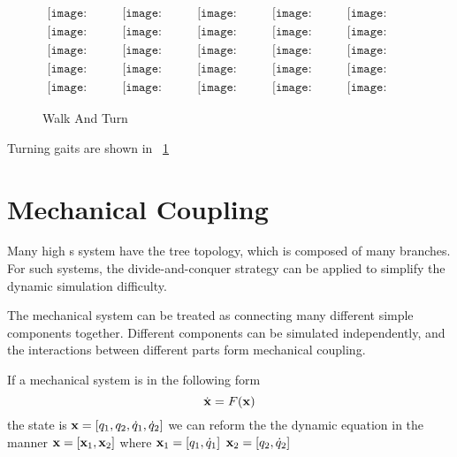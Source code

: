 {\begin{figure}[!htbp]
  \begin{center}
  $
     \begin{array}{ccccc}
\texttt{[image: turn/0001.eps]}&
\texttt{[image: turn/0201.eps]}&
\texttt{[image: turn/0301.eps]}&
\texttt{[image: turn/0401.eps]}&
\texttt{[image: turn/0501.eps]}
\\
\texttt{[image: turn/0601.eps]}&
\texttt{[image: turn/0701.eps]}&
\texttt{[image: turn/0801.eps]}&
\texttt{[image: turn/0901.eps]}&
\texttt{[image: turn/1001.eps]}
\\
\texttt{[image: turn/1101.eps]}&
\texttt{[image: turn/1201.eps]}&
\texttt{[image: turn/1301.eps]}&
\texttt{[image: turn/1401.eps]}&
\texttt{[image: turn/1501.eps]}
\\
\texttt{[image: turn/1601.eps]}&
\texttt{[image: turn/1701.eps]}&
\texttt{[image: turn/1801.eps]}&
\texttt{[image: turn/1901.eps]}&
\texttt{[image: turn/2001.eps]}
\\
\texttt{[image: turn/2101.eps]}&
\texttt{[image: turn/2201.eps]}&
\texttt{[image: turn/2301.eps]}&
\texttt{[image: turn/2401.eps]}&
\texttt{[image: turn/2501.eps]}

\end{array}$
    \caption{Walk And Turn}
    \label{fig:walkturn}
\end{center}
\end{figure}
Turning gaits are shown in ~\ref{fig:walkturn}




\section{Mechanical Coupling}
Many high {\dof}s system have the tree topology, which is composed of many branches.
For such systems, the divide-and-conquer strategy can be applied to simplify the dynamic simulation difficulty.

The mechanical system can be treated as connecting many different simple components together.
Different components can be simulated independently, and the interactions between different parts form mechanical coupling.

If a mechanical system is in the following form
\[
\dot{\mathbf{x}}=F(\mathbf{x})
\]
the state is $\mathbf{x}=[q_1,q_2,\dot{q}_1,\dot{q}_2]$
we can reform the the dynamic equation in the manner
$\mathbf{x}=[\mathbf{x}_1,\mathbf{x}_2]$
where
$\mathbf{x}_1=[q_1,\dot{q}_1]$
$\mathbf{x}_2=[q_2,\dot{q}_2]$

}
